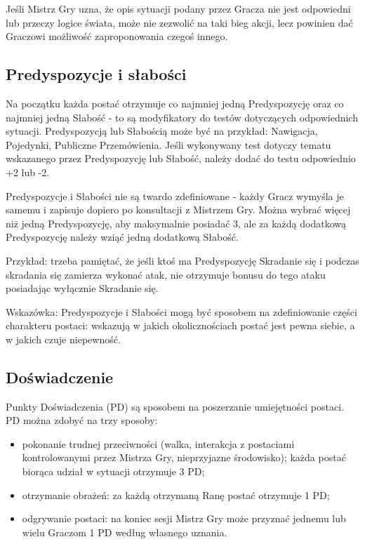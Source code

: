 \documentclass[10pt,a4paper]{book}
\begin{document}
\begin{multicols}{2}
Jeśli Mistrz Gry uzna, że opis sytuacji podany przez Gracza nie jest odpowiedni lub przeczy logice świata, może nie zezwolić na taki bieg akcji, lecz powinien dać Graczowi możliwość zaproponowania czegoś innego.


\subsection*{Predyspozycje i słabości}
Na początku każda postać otrzymuje co najmniej jedną Predyspozycję oraz co najmniej jedną Słabość - to są modyfikatory do testów dotyczących odpowiednich sytuacji. Predyspozycją lub Słabością może być na przykład: Nawigacja, Pojedynki, Publiczne Przemówienia. Jeśli wykonywany test dotyczy tematu wskazanego przez Predyspozycję lub Słabość, należy dodać do testu odpowiednio +2 lub -2.

Predyspozycje i Słabości nie są twardo zdefiniowane - każdy Gracz wymyśla je samemu i zapisuje dopiero po konsultacji z Mistrzem Gry. Można wybrać więcej niż jedną Predyspozycję, aby maksymalnie posiadać 3, ale za każdą dodatkową Predyspozycję należy wziąć jedną dodatkową Słabość.

Przykład: trzeba pamiętać, że jeśli ktoś ma Predyspozycję Skradanie się i podczas skradania się zamierza wykonać atak, nie otrzymuje bonusu do tego ataku posiadając wyłącznie Skradanie się.

Wskazówka: Predyspozycje i Słabości mogą być sposobem na zdefiniowanie części charakteru postaci: wskazują w jakich okolicznościach postać jest pewna siebie, a w jakich czuje niepewność.


\subsection*{Doświadczenie}
Punkty Doświadczenia (PD) są sposobem na poszerzanie umiejętności postaci. PD można zdobyć na trzy sposoby:
\begin{itemize}
	\item pokonanie trudnej przeciwności (walka, interakcja z postaciami kontrolowanymi przez Mistrza Gry, nieprzyjazne środowisko); każda postać biorąca udział w sytuacji otrzymuje 3 PD;
	\item otrzymanie obrażeń: za każdą otrzymaną Ranę postać otrzymuje 1 PD;
	\item odgrywanie postaci: na koniec sesji Mistrz Gry może przyznać jednemu lub wielu Graczom 1 PD według własnego uznania.
\end{itemize}


\end{multicols}
\end{document}
